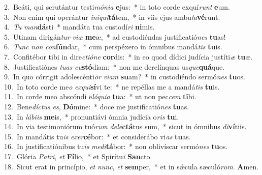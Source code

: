 {2.~}Beáti, qui scrutántur testi\textit{mó}\textit{ni}\textit{a} \textbf{e}jus:~* in toto corde exquí\textit{runt} \textbf{e}um.\\
{3.~}Non enim qui operántur \textit{i}\textit{ni}\textit{qui}\textbf{tá}tem,~* in viis ejus ambu\textit{la}\textbf{vé}runt.\\
{4.~}\textit{Tu} \textit{man}\textbf{dá}sti~* mandáta tua custodí\textit{ri} \textbf{ni}mis.\\
{5.~}Utinam dirigán\textit{tur} \textit{vi}\textit{æ} \textbf{me}æ,~* ad custodiéndas justificatió\textit{nes} \textbf{tu}as!\\
{6.~}\textit{Tunc} \textit{non} \textit{con}\textbf{fún}dar,~* cum perspéxero in ómnibus mandá\textit{tis} \textbf{tu}is.\\
{7.~}Confitébor tibi in dire\textit{cti}\textit{ó}\textit{ne} \textbf{cor}dis:~* in eo quod dídici judícia justíti\textit{æ} \textbf{tu}æ.\\
{8.~}Justificatiónes \textit{tu}\textit{as} \textit{cu}\textbf{stó}diam:~* non me derelínquas us\textit{que}\textbf{quá}que.\\
{9.~}In quo córrigit adolescénti\textit{or} \textit{vi}\textit{am} \textbf{su}am?~* in custodiéndo sermó\textit{nes} \textbf{tu}os.\\
{10.~}In toto corde me\textit{o} \textit{ex}\textit{qui}\textbf{sí}vi te:~* ne repéllas me a mandá\textit{tis} \textbf{tu}is.\\
{11.~}In corde meo abscóndi e\textit{ló}\textit{qui}\textit{a} \textbf{tu}a:~* ut non pec\textit{cem} \textbf{ti}bi.\\
{12.~}Bene\textit{dí}\textit{ctus} \textit{es}, \textbf{Dó}mine:~* doce me justificatió\textit{nes} \textbf{tu}as.\\
{13.~}In \textit{lá}\textit{bi}\textit{is} \textbf{me}is,~* pronuntiávi ómnia judícia o\textit{ris} \textbf{tu}i.\\
{14.~}In via testimoniórum tuó\textit{rum} \textit{de}\textit{le}\textbf{ctá}tus sum,~* sicut in ómnibus \textit{di}\textbf{ví}tiis.\\
{15.~}In mandátis tu\textit{is} \textit{e}\textit{xer}\textbf{cé}bor:~* et considerábo vi\textit{as} \textbf{tu}as.\\
{16.~}In justificatiónibus tu\textit{is} \textit{me}\textit{di}\textbf{tá}bor:~* non oblivíscar sermó\textit{nes} \textbf{tu}os.\\
{17.~}Glória \textit{Pa}\textit{tri}, \textit{et} \textbf{Fí}lio,~* et Spirítu\textit{i} \textbf{San}cto.\\
{18.~}Sicut erat in princípio, \textit{et} \textit{nunc}, \textit{et} \textbf{sem}per,~* et in sǽcula sæculó\textit{rum}. \textbf{A}men.\\
